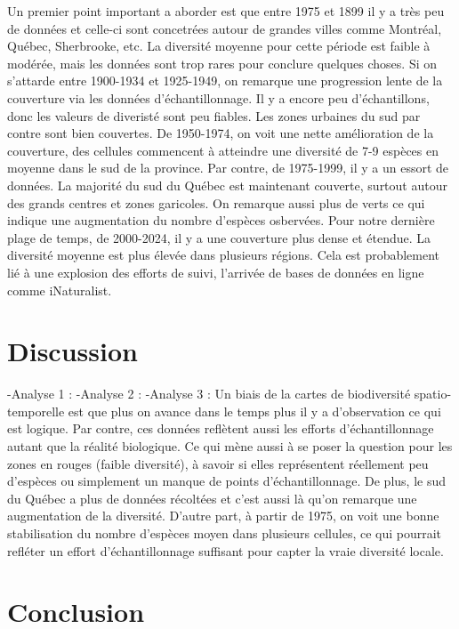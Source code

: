 \documentclass[9pt,twocolumn,twoside,]{pnas-new}
\begin{document}
Un premier point important a aborder est que entre 1975 et 1899 il y a
très peu de données et celle-ci sont concetrées autour de grandes villes
comme Montréal, Québec, Sherbrooke, etc. La diversité moyenne pour cette
période est faible à modérée, mais les données sont trop rares pour
conclure quelques choses. Si on s'attarde entre 1900-1934 et 1925-1949,
on remarque une progression lente de la couverture via les données
d'échantillonnage. Il y a encore peu d'échantillons, donc les valeurs de
diveristé sont peu fiables. Les zones urbaines du sud par contre sont
bien couvertes. De 1950-1974, on voit une nette amélioration de la
couverture, des cellules commencent à atteindre une diversité de 7-9
espèces en moyenne dans le sud de la province. Par contre, de 1975-1999,
il y a un essort de données. La majorité du sud du Québec est maintenant
couverte, surtout autour des grands centres et zones garicoles. On
remarque aussi plus de verts ce qui indique une augmentation du nombre
d'espèces osbervées. Pour notre dernière plage de temps, de 2000-2024,
il y a une couverture plus dense et étendue. La diversité moyenne est
plus élevée dans plusieurs régions. Cela est probablement lié à une
explosion des efforts de suivi, l'arrivée de bases de données en ligne
comme iNaturalist.

\section{Discussion}\label{discussion}

-Analyse 1 : -Analyse 2 : -Analyse 3 : Un biais de la cartes de
biodiversité spatio-temporelle est que plus on avance dans le temps plus
il y a d'observation ce qui est logique. Par contre, ces données
reflètent aussi les efforts d'échantillonnage autant que la réalité
biologique. Ce qui mène aussi à se poser la question pour les zones en
rouges (faible diversité), à savoir si elles représentent réellement peu
d'espèces ou simplement un manque de points d'échantillonnage. De plus,
le sud du Québec a plus de données récoltées et c'est aussi là qu'on
remarque une augmentation de la diversité. D'autre part, à partir de
1975, on voit une bonne stabilisation du nombre d'espèces moyen dans
plusieurs cellules, ce qui pourrait refléter un effort d'échantillonnage
suffisant pour capter la vraie diversité locale.

\section{Conclusion}\label{conclusion}
\end{document}
